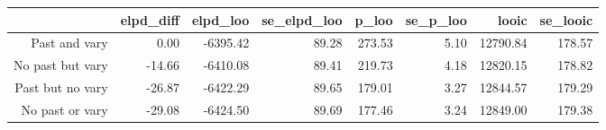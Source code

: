 \begin{table}[ht]
\centering
\begin{tabular}{rrrrrrrr}
  \hline
 & elpd\_diff & elpd\_loo & se\_elpd\_loo & p\_loo & se\_p\_loo & looic & se\_looic \\ 
  \hline
Past and vary & 0.00 & -6395.42 & 89.28 & 273.53 & 5.10 & 12790.84 & 178.57 \\ 
  No past but vary & -14.66 & -6410.08 & 89.41 & 219.73 & 4.18 & 12820.15 & 178.82 \\ 
  Past but no vary & -26.87 & -6422.29 & 89.65 & 179.01 & 3.27 & 12844.57 & 179.29 \\ 
  No past or vary & -29.08 & -6424.50 & 89.69 & 177.46 & 3.24 & 12849.00 & 179.38 \\ 
   \hline
\end{tabular}
\end{table}
